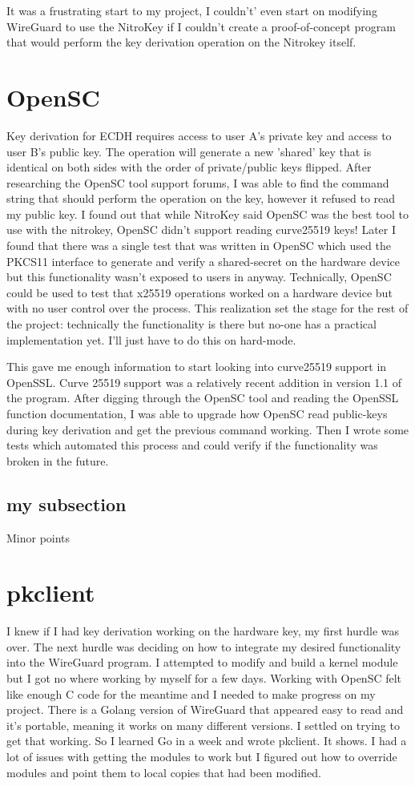 \documentclass [11pt, proquest] {uwthesis}[2020/02/24]
\begin{document}
It was a frustrating start to my project, I couldn't' even start on modifying WireGuard to use the NitroKey if I couldn't create a proof-of-concept program that would perform the key derivation operation on the Nitrokey itself.
\section {OpenSC}
Key derivation for ECDH requires access to user A's private key and access to user B's public key. The operation will generate a new 'shared' key that is identical on both sides with the order of private/public keys flipped.
After researching the OpenSC tool support forums, I was able to find the command string that should perform the operation on the key, however it refused to read my public key. I found out that while NitroKey said OpenSC was the best tool to use with the nitrokey, OpenSC didn't support reading curve25519 keys! Later I found that there was a single test that was written in OpenSC which used the PKCS11 interface to generate and verify a shared-secret on the hardware device but this functionality wasn't exposed to users in anyway. Technically, OpenSC could be used to test that x25519 operations worked on a hardware device but with no user control over the process. This realization set the stage for the rest of the project: technically the functionality is there but no-one has a practical implementation yet. I'll just have to do this on hard-mode.

This gave me enough information to start looking into curve25519 support in OpenSSL. Curve 25519 support was a relatively recent addition in version 1.1 of the program\cite{noauthor_support_nodate}.
After digging through the OpenSC tool and reading the OpenSSL function documentation, I was able to upgrade how OpenSC read public-keys during key derivation and get the previous command working.
Then I wrote some tests which automated this process and could verify if the functionality was broken in the future.
\subsection {my subsection}
Minor points

\section{pkclient}
I knew if I had key derivation working on the hardware key, my first hurdle was over. The next hurdle was deciding on how to integrate my desired functionality into the WireGuard program. I attempted to modify and build a kernel module but I got no where working by myself for a few days. Working with OpenSC felt like enough C code for the meantime and I needed to make progress on my project. There is a Golang version of WireGuard that appeared easy to read and it's portable, meaning it works on many different versions. I settled on trying to get that working. So I learned Go in a week and wrote pkclient. It shows. I had a lot of issues with getting the modules to work  but I figured out how to override modules and point them to local copies that had been modified.
\end{document}
